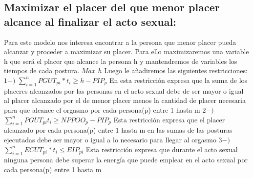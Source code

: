\documentclass{llncs}
\begin{document}
\subsection{Maximizar el placer del que menor placer alcance al finalizar el acto sexual:}
Para este modelo nos interesa encontrar a la persona que menor placer pueda alcanzar y proceder a maximizar su placer. Para ello maximizaremos una variable h que será el placer que alcance la persona h y mantendremos de variables los tiempos de cada postura.
\newline
\newline
$Max$ $h$
\newline
\newline
Luego le añadiremos las siguientes restricciones:
\newline
\newline
$1-)$ $\sum_{i=1}^{n} PGUT_{pi}*t_{i} \geq h - PIP_{p}$
\newline
\newline
En esta restricción expresa que la suma de los placeres alcanzados por las personas en el acto sexual debe de ser mayor o igual al placer alcanzado por el de menor placer menos la cantidad de placer necesaria para que alcance el orgasmo por cada persona(p) entre 1 hasta m
\newline
\newline
$2-)$ $\sum_{i=1}^{n} PGUT_{pi}t_{i} \geq NPPOO_{p} - PIP_{p}$
\newline
\newline
Esta restricción expresa que el placer alcanzado por cada persona(p) entre 1 hasta m en las sumas de las posturas ejecutadas debe ser mayor o igual a lo necesario para llegar al orgasmo
\newline
\newline
$3-)$ $\sum_{i=1}^{n} ECUT_{pi}*t_{i} \leq EIP_{pi}$
\newline
\newline
Esta restricción expresa que durante el acto sexual ninguna persona debe superar la energía que puede emplear en el acto sexual por cada persona(p) entre 1 hasta m
\end{document}
